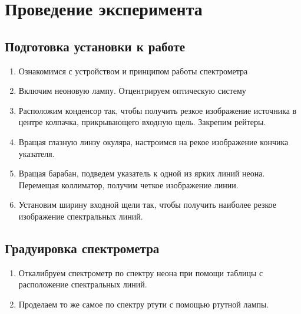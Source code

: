 \documentclass[14pt, a4paper]{report}
\begin{document}
\section{Проведение эксперимента}

\subsection{Подготовка установки к работе}

\begin{enumerate}

\setcounter{enumi}{0}

\item Ознакомимся с устройством и принципом работы спектрометра

\item Включим неоновую лампу. Отцентрируем оптическую систему

\item Расположим конденсор так, чтобы получить резкое изображение источника в центре колпачка, прикрывающего входную щель. Закрепим рейтеры.

\item Вращая глазную линзу окуляра, настроимся на рекое изображение кончика указателя.

\item Вращая барабан, подведем указатель к одной из ярких линий неона. Перемещая коллиматор, получим четкое изображение линии.

\item Установим ширину входной щели так, чтобы получить наиболее резкое изображение спектральных линий.

\end{enumerate}

\subsection{Градуировка спектрометра}

\begin{enumerate}

\setcounter{enumi}{0}

\item Откалибруем спектрометр по спектру неона при помощи таблицы с расположение спектральных линий.

\item Проделаем то же самое по спектру ртути с помощью ртутной лампы.

\end{enumerate}
\end{document}
